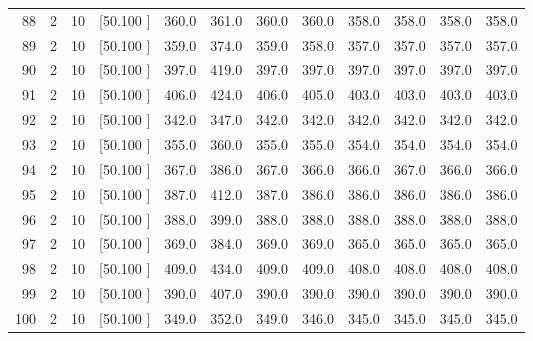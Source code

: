 \documentclass[12pt,a4paper]{article}
\begin{document}
\begin{center}
{\begin{tabular}{r r r r r r r r r r r r}
  88&  2& 10&[50.100    ]&   360.0&   361.0&   360.0&   360.0&   358.0&   358.0&   358.0&   358.0\\[-0.02in]
  89&  2& 10&[50.100    ]&   359.0&   374.0&   359.0&   358.0&   357.0&   357.0&   357.0&   357.0\\[-0.02in]
  90&  2& 10&[50.100    ]&   397.0&   419.0&   397.0&   397.0&   397.0&   397.0&   397.0&   397.0\\[-0.02in]
  91&  2& 10&[50.100    ]&   406.0&   424.0&   406.0&   405.0&   403.0&   403.0&   403.0&   403.0\\[-0.02in]
  92&  2& 10&[50.100    ]&   342.0&   347.0&   342.0&   342.0&   342.0&   342.0&   342.0&   342.0\\[-0.02in]
  93&  2& 10&[50.100    ]&   355.0&   360.0&   355.0&   355.0&   354.0&   354.0&   354.0&   354.0\\[-0.02in]
  94&  2& 10&[50.100    ]&   367.0&   386.0&   367.0&   366.0&   366.0&   367.0&   366.0&   366.0\\[-0.02in]
  95&  2& 10&[50.100    ]&   387.0&   412.0&   387.0&   386.0&   386.0&   386.0&   386.0&   386.0\\[-0.02in]
  96&  2& 10&[50.100    ]&   388.0&   399.0&   388.0&   388.0&   388.0&   388.0&   388.0&   388.0\\[-0.02in]
  97&  2& 10&[50.100    ]&   369.0&   384.0&   369.0&   369.0&   365.0&   365.0&   365.0&   365.0\\[-0.02in]
  98&  2& 10&[50.100    ]&   409.0&   434.0&   409.0&   409.0&   408.0&   408.0&   408.0&   408.0\\[-0.02in]
  99&  2& 10&[50.100    ]&   390.0&   407.0&   390.0&   390.0&   390.0&   390.0&   390.0&   390.0\\[-0.02in]
 100&  2& 10&[50.100    ]&   349.0&   352.0&   349.0&   346.0&   345.0&   345.0&   345.0&   345.0\\[-0.02in]

\hline
\end{tabular}}
\end{center}
\end{document}
